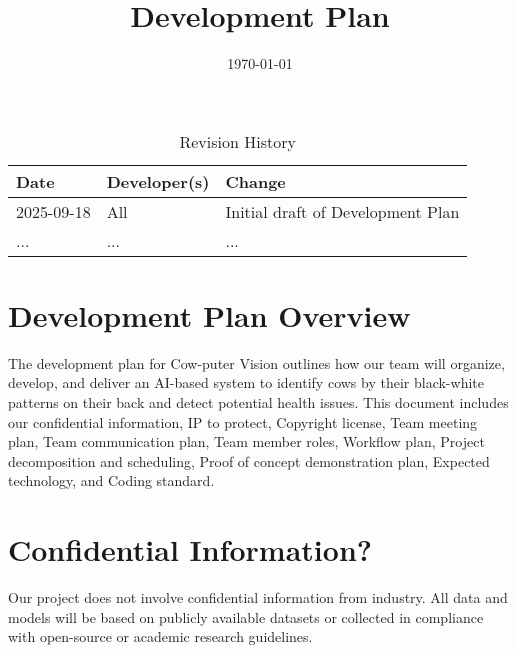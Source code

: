 \documentclass{article}
\title{Development Plan\\\progname}
\author{\authname}
\date{\today}
\newcommand{\progname}{Cow-puter Vision} %
\begin{document}
\maketitle

\begin{table}[hp]
\caption{Revision History} \label{TblRevisionHistory}
\begin{tabularx}{\textwidth}{llX}
\toprule
\textbf{Date} & \textbf{Developer(s)} & \textbf{Change}\\
\midrule
2025-09-18 & All & Initial draft of Development Plan \\
... & ... & ...\\
\bottomrule
\end{tabularx}
\end{table}

\newpage{}


\section{Development Plan Overview}
The development plan for \progname{} outlines how our team will organize, develop, 
and deliver an AI-based system to identify cows by their black-white patterns on their back 
and detect potential health issues. This document includes our confidential information, 
IP to protect, Copyright license, Team meeting plan, Team communication plan, Team member 
roles, Workflow plan, Project decomposition and scheduling, Proof of concept demonstration 
plan, Expected technology, and Coding standard.


\section{Confidential Information?}


Our project does not involve confidential information from industry. 
All data and models will be based on publicly available datasets or 
collected in compliance with open-source or academic research guidelines.
\end{document}
